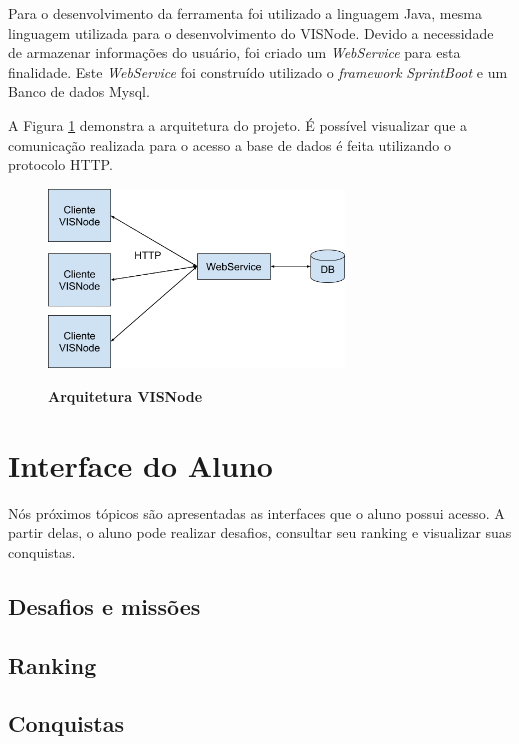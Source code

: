 \documentclass[
	12pt,				%
	oneside,			%
	a4paper,			%
	english,			%
	french,				%
	spanish,			%
	brazil,				%
	]{abntex2}
\begin{document}
Para o desenvolvimento da ferramenta foi utilizado a linguagem Java, mesma linguagem utilizada para o desenvolvimento do VISNode. Devido a necessidade de armazenar informações do usuário, foi criado um \textit{WebService} para esta finalidade. Este \textit{WebService} foi construído utilizado o \textit{framework} \textit{SprintBoot} e um Banco de dados Mysql.

A Figura \ref{fig:visnodeArquitetura} demonstra a arquitetura do projeto. É possível visualizar que a comunicação realizada para o acesso a base de dados é feita utilizando o protocolo HTTP. 

\begin{figure}[ht]
\centering
\caption{\textbf{Arquitetura VISNode}}
\includegraphics[width=0.7\textwidth]{imagens/visnode_arquitetura.png}
\sourceAuthor
\label{fig:visnodeArquitetura}
\end{figure}

\section{Interface do Aluno}

Nós próximos tópicos são apresentadas as interfaces que o aluno possui acesso. A partir delas, o aluno pode realizar desafios, consultar seu ranking e visualizar suas conquistas.

\subsection{Desafios e missões}



\subsection{Ranking}

\subsection{Conquistas}
\end{document}
